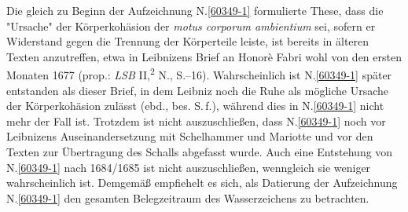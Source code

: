 \pend%
\pstart%
Die gleich zu Beginn der Aufzeichnung N.\;\ref{60349-1} formulierte These, dass die "Ursache" der Körperkohäsion der \textit{motus corporum ambientium} sei, sofern er Widerstand gegen die Trennung der Körperteile leiste, ist bereits in älteren Texten anzutreffen, etwa in Leibnizens Brief an Honorè Fabri wohl von den ersten Monaten 1677 (prop.: \textit{LSB} II,\textsuperscript{2} N., S.--16).\cite{01309}
Wahrscheinlich ist N.\;\ref{60349-1} später entstanden als dieser Brief, %
in dem Leibniz noch die Ruhe als mögliche Ursache der Körperkohäsion zulässt (ebd., %
bes. S.\,f.),\cite{01309} während dies in N.\;\ref{60349-1} nicht mehr der Fall ist.
Trotzdem ist nicht auszuschließen, dass N.\;\ref{60349-1} noch vor Leibnizens Auseinandersetzung mit Schelhammer und Mariotte und vor den Texten zur Übertragung des Schalls abgefasst wurde.
Auch eine Entstehung von N.\;\ref{60349-1} nach 1684/1685 ist nicht auszuschließen, wenngleich sie weniger wahrscheinlich ist.
Demgemäß empfiehelt es sich, als Datierung der Aufzeichnung N.\;\ref{60349-1} den gesamten Belegzeitraum des Wasserzeichens zu betrachten.%
\pend%
%
\frenchspacing%
\normalsize%
